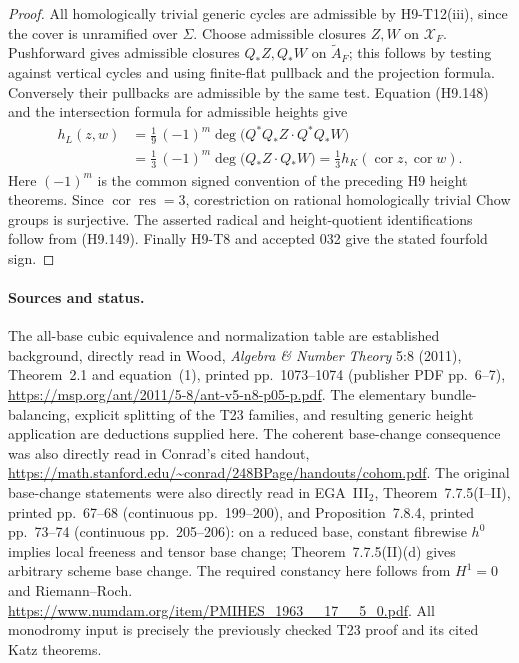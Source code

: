 \begin{proof}
All homologically trivial generic cycles are
admissible by H9-T12(iii), since the cover is
unramified over $\Sigma$. Choose admissible closures
$Z,W$ on $\mathcal X_F$. Pushforward gives
admissible closures $Q_*Z,Q_*W$ on $\widetilde A_F$;
this follows by testing against vertical cycles
and using finite-flat pullback and the projection
formula. Conversely their pullbacks are admissible
by the same test. Equation (H9.148) and the
intersection formula for admissible heights give
\[
 \begin{split}
 h_L(z,w)
  &=\frac1{9}\,(-1)^m
       \deg\bigl(Q^*Q_*Z\cdot Q^*Q_*W\bigr)\\
  &=\frac13\,(-1)^m
       \deg\bigl(Q_*Z\cdot Q_*W\bigr)
   =\frac13h_K(\operatorname{cor}z,\operatorname{cor}w).
 \end{split}                                                   \tag{H9.149}
\]
Here $(-1)^m$ is the common signed convention of
the preceding H9 height theorems. Since
$\operatorname{cor}\operatorname{res}=3$, corestriction
on rational homologically trivial Chow groups is
surjective. The asserted radical and height-quotient
identifications follow from (H9.149). Finally H9-T8
and accepted 032 give the stated fourfold sign.
\end{proof}

\paragraph{Sources and status.}
The all-base cubic equivalence and normalization
table are established background, directly read
in Wood, \emph{Algebra \& Number Theory} 5:8 (2011),
Theorem~2.1 and equation~(1), printed pp.~1073--1074
(publisher PDF pp.~6--7),
\url{https://msp.org/ant/2011/5-8/ant-v5-n8-p05-p.pdf}.
The elementary bundle-balancing, explicit splitting
of the T23 families, and resulting generic height
application are deductions supplied here. The
coherent base-change consequence was also directly
read in Conrad's cited handout,
\url{https://math.stanford.edu/~conrad/248BPage/handouts/cohom.pdf}.
The original base-change statements were also directly read in
EGA~III$_2$, Theorem~7.7.5(I--II), printed pp.~67--68
(continuous pp.~199--200), and Proposition~7.8.4, printed
pp.~73--74 (continuous pp.~205--206): on a reduced base,
constant fibrewise $h^0$ implies local freeness and tensor
base change; Theorem~7.7.5(II)(d) gives arbitrary scheme
base change. The required constancy here follows from
$H^1=0$ and Riemann--Roch.
\url{https://www.numdam.org/item/PMIHES_1963__17__5_0.pdf}.
All monodromy input is precisely the previously
checked T23 proof and its cited Katz theorems.
